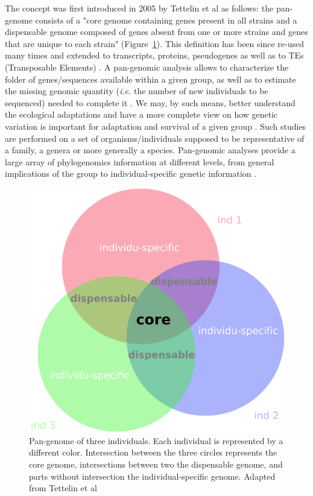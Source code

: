 \documentclass[a4paper,10pt,twoside]{report}
\begin{document}
The concept was first introduced in 2005 by Tettelin et al as follows: the pan-genome consists of a "core genome containing genes present in all strains and a dispensable genome composed of genes absent from one or more strains and genes that are unique to each strain" \cite{Tettelin2005}(Figure~\ref{pangenome}). This definition has been since re-used many times \cite{Tettelin2008,Liang2012,Lukjancenko2012,Mann2013,Lukjancenko2013,Kahlke2013,Soares2013} and extended to transcripts, proteins, pseudogenes as well as to TEs (Transposable Elements) \cite{Lukjancenko2013,Nguyen2014,Hirsch2014}. A pan-genomic analysis allows to characterize the folder of genes/sequences available within a given group, as well as to estimate the missing genomic quantity (\textit{i.e.} the number of new individuals to be sequenced) needed to complete it \cite{Tettelin2008}. We may, by such means, better understand the ecological adaptations and have a more complete view on how genetic variation is important for adaptation and survival of a given group \cite{Hansen2012}. Such studies are performed on a set of organisms/individuals supposed to be representative of a family, a genera or more generally a species. Pan-genomic analyses provide a large array of phylogenomics information at different levels, from general implications of the group to individual-specific genetic information \cite{Kahlke2013,Soares2013}.

\begin{figure}[h]
\centering
 \includegraphics[scale=1]{panG.pdf}
 \caption[Pan-genome of three individuals]{Pan-genome of three individuals. Each individual is represented by a different color. Intersection between the three circles represents the core genome, intersections between two the dispensable genome, and parts without intersection the individual-specific genome. Adapted from Tettelin et al \cite{Tettelin2005}}
 \label{pangenome}
\end{figure}
\end{document}
